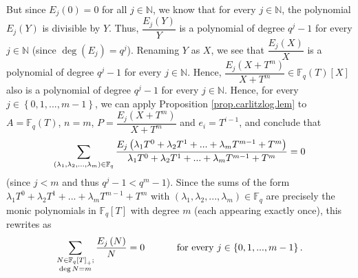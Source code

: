 \documentclass[numbers=enddot,12pt,final,onecolumn,notitlepage]{scrartcl}%
\theoremstyle{definition}
\let\sumnonlimits\sum
\renewcommand{\sum}{\sumnonlimits\limits}
\begin{document}
But since $E_{j}\left(  0\right)  =0$ for all $j\in\mathbb{N}$, we know that
for every $j\in\mathbb{N}$, the polynomial $E_{j}\left(  Y\right)  $ is
divisible by $Y$. Thus, $\dfrac{E_{j}\left(  Y\right)  }{Y}$ is a polynomial
of degree $q^{j}-1$ for every $j\in\mathbb{N}$ (since $\deg\left(
E_{j}\right)  =q^{j}$). Renaming $Y$ as $X$, we see that $\dfrac{E_{j}\left(
X\right)  }{X}$ is a polynomial of degree $q^{j}-1$ for every $j\in\mathbb{N}%
$. Hence, $\dfrac{E_{j}\left(  X+T^{m}\right)  }{X+T^{m}}\in\mathbb{F}%
_{q}\left(  T\right)  \left[  X\right]  $ also is a polynomial of degree
$q^{j}-1$ for every $j\in\mathbb{N}$. Hence, for every $j\in\left\{
0,1,...,m-1\right\}  $, we can apply Proposition \ref{prop.carlitzlog.lem} to
$A=\mathbb{F}_{q}\left(  T\right)  $, $n=m$, $P=\dfrac{E_{j}\left(
X+T^{m}\right)  }{X+T^{m}}$ and $e_{i}=T^{i-1}$, and conclude that
\[
\sum\limits_{\left(  \lambda_{1},\lambda_{2},...,\lambda_{m}\right)
\in\mathbb{F}_{q}}\dfrac{E_{j}\left(  \lambda_{1}T^{0}+\lambda_{2}%
T^{1}+...+\lambda_{m}T^{m-1}+T^{m}\right)  }{\lambda_{1}T^{0}+\lambda_{2}%
T^{1}+...+\lambda_{m}T^{m-1}+T^{m}}=0
\]
(since $j<m$ and thus $q^{j}-1<q^{m}-1$). Since the sums of the form
$\lambda_{1}T^{0}+\lambda_{2}T^{1}+...+\lambda_{m}T^{m-1}+T^{m}$ with $\left(
\lambda_{1},\lambda_{2},...,\lambda_{m}\right)  \in\mathbb{F}_{q}$ are
precisely the monic polynomials in $\mathbb{F}_{q}\left[  T\right]  $ with
degree $m$ (each appearing exactly once), this rewrites as%
\begin{equation}
\sum\limits_{\substack{N\in\mathbb{F}_{q}\left[  T\right]  _{+};\\\deg
N=m}}\dfrac{E_{j}\left(  N\right)  }{N}=0\ \ \ \ \ \ \ \ \ \ \text{for every
}j\in\left\{  0,1,...,m-1\right\}  \text{.} \label{pf.carlitzlog.lem2.8}%
\end{equation}
\end{document}
